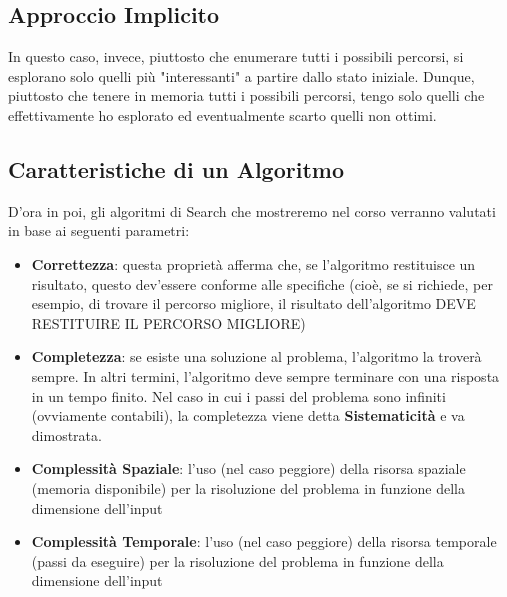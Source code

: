 \subsection{Approccio Implicito}
In questo caso, invece, piuttosto che enumerare tutti i possibili percorsi, si esplorano solo quelli più "interessanti" a partire dallo stato iniziale. Dunque,
piuttosto che tenere in memoria tutti i possibili percorsi, tengo solo quelli che effettivamente ho esplorato ed eventualmente scarto quelli non ottimi.

\subsection{Caratteristiche di un Algoritmo}
D'ora in poi, gli algoritmi di Search che mostreremo nel corso verranno valutati in base ai seguenti parametri:
\begin{itemize}
    \item \textbf{Correttezza}: questa proprietà afferma che, se l'algoritmo restituisce un risultato, questo dev'essere conforme alle specifiche 
    (cioè, se si richiede, per esempio, di trovare il percorso migliore, il risultato dell'algoritmo DEVE RESTITUIRE IL PERCORSO MIGLIORE)
    \item \textbf{Completezza}: se esiste una soluzione al problema, l'algoritmo la troverà sempre. In altri termini, l'algoritmo deve sempre terminare con una risposta in un tempo finito. 
    Nel caso in cui i passi del problema sono infiniti (ovviamente contabili), la completezza viene detta \textbf{Sistematicità} e va dimostrata.
    \item \textbf{Complessità Spaziale}: l'uso (nel caso peggiore) della risorsa spaziale (memoria disponibile) per la risoluzione del problema in funzione della dimensione dell'input
    \item \textbf{Complessità Temporale}: l'uso (nel caso peggiore) della risorsa temporale (passi da eseguire) per la risoluzione del problema in funzione della dimensione dell'input
\end{itemize}


